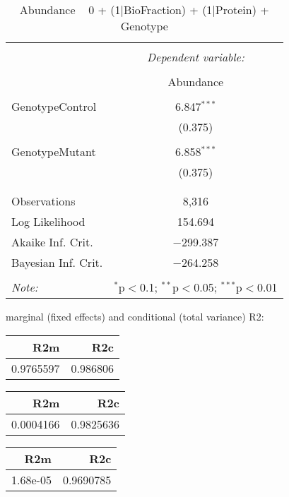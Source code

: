 \documentclass[11pt]{report}
\begin{document}
\begin{table}[!htbp] \centering 
  \caption{Abundance ~ 0 + (1|BioFraction) + (1|Protein) + Genotype} 
  \label{} 
\begin{tabular}{@{\extracolsep{5pt}}lc} 
\\[-1.8ex]\hline 
\hline \\[-1.8ex] 
 & \multicolumn{1}{c}{\textit{Dependent variable:}} \\ 
\cline{2-2} 
\\[-1.8ex] & Abundance \\ 
\hline \\[-1.8ex] 
 GenotypeControl & 6.847$^{***}$ \\ 
  & (0.375) \\ 
  & \\ 
 GenotypeMutant & 6.858$^{***}$ \\ 
  & (0.375) \\ 
  & \\ 
\hline \\[-1.8ex] 
Observations & 8,316 \\ 
Log Likelihood & 154.694 \\ 
Akaike Inf. Crit. & $-$299.387 \\ 
Bayesian Inf. Crit. & $-$264.258 \\ 
\hline 
\hline \\[-1.8ex] 
\textit{Note:}  & \multicolumn{1}{r}{$^{*}$p$<$0.1; $^{**}$p$<$0.05; $^{***}$p$<$0.01} \\ 
\end{tabular} 
\end{table} 
marginal (fixed effects) and conditional (total variance) R2:

\begin{tabular}{r|r}
\hline
R2m & R2c\\
\hline
0.9765597 & 0.986806\\
\hline
\end{tabular}

\begin{tabular}{r|r}
\hline
R2m & R2c\\
\hline
0.0004166 & 0.9825636\\
\hline
\end{tabular}

\begin{tabular}{r|r}
\hline
R2m & R2c\\
\hline
1.68e-05 & 0.9690785\\
\hline
\end{tabular}
\end{document}
